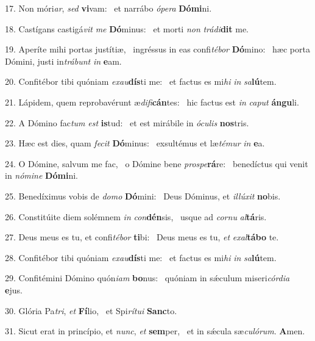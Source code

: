 17. Non móri\textit{ar}, \textit{sed} \textbf{vi}vam: \ast\  et narrábo \textit{ó}\textit{pe}\textit{ra} \textbf{Dó}\textbf{mi}ni.\

18. Castígans castigá\textit{vit} \textit{me} \textbf{Dó}minus: \ast\  et morti \textit{non} \textit{trá}\textit{di}\textbf{dit} me.\

19. Aperíte mihi portas justítiæ, \dag\  ingréssus in eas confi\textit{té}\textit{bor} \textbf{Dó}mino: \ast\  hæc porta Dómini, justi in\textit{trá}\textit{bunt} \textit{in} \textbf{e}am.\

20. Confitébor tibi quóniam \textit{ex}\textit{au}\textbf{dís}ti me: \ast\  et factus es mi\textit{hi} \textit{in} \textit{sa}\textbf{lú}tem.\

21. Lápidem, quem reprobavérunt æ\textit{di}\textit{fi}\textbf{cán}tes: \ast\  hic factus est \textit{in} \textit{ca}\textit{put} \textbf{án}\textbf{gu}li.\

22. A Dómino fac\textit{tum} \textit{est} \textbf{is}tud: \ast\  et est mirábile in \textit{ó}\textit{cu}\textit{lis} \textbf{nos}tris.\

23. Hæc est dies, quam \textit{fe}\textit{cit} \textbf{Dó}minus: \ast\  exsultémus et læ\textit{té}\textit{mur} \textit{in} \textbf{e}a.\

24. O Dómine, salvum me fac, \dag\  o Dómine bene \textit{pro}\textit{spe}\textbf{rá}re: \ast\  benedíctus qui venit in \textit{nó}\textit{mi}\textit{ne} \textbf{Dó}\textbf{mi}ni.\

25. Benedíximus vobis de \textit{do}\textit{mo} \textbf{Dó}mini: \ast\  Deus Dóminus, et \textit{il}\textit{lú}\textit{xit} \textbf{no}bis.\

26. Constitúite diem solémnem \textit{in} \textit{con}\textbf{dén}sis, \ast\  usque ad \textit{cor}\textit{nu} \textit{al}\textbf{tá}ris.\

27. Deus meus es tu, et confi\textit{té}\textit{bor} \textbf{ti}bi: \ast\  Deus meus es tu, \textit{et} \textit{ex}\textit{al}\textbf{tá}\textbf{bo} te.\

28. Confitébor tibi quóniam \textit{ex}\textit{au}\textbf{dís}ti me: \ast\  et factus es mi\textit{hi} \textit{in} \textit{sa}\textbf{lú}tem.\

29. Confitémini Dómino quón\textit{i}\textit{am} \textbf{bo}nus: \ast\  quóniam in sǽculum miseri\textit{cór}\textit{di}\textit{a} \textbf{e}jus.\

30. Glória Pa\textit{tri}, \textit{et} \textbf{Fí}lio, \ast\  et Spi\textit{rí}\textit{tu}\textit{i} \textbf{Sanc}to.\

31. Sicut erat in princípio, et \textit{nunc}, \textit{et} \textbf{sem}per, \ast\  et in sǽcula sæ\textit{cu}\textit{ló}\textit{rum}. \textbf{A}men.\

